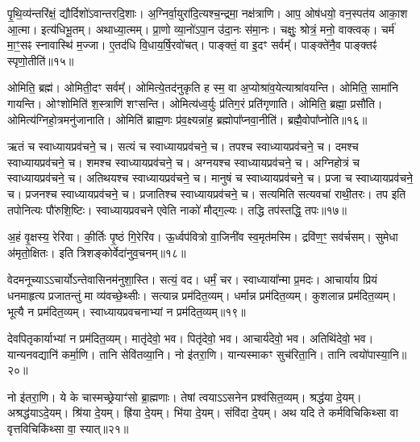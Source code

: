 पृ॒थि॒व्य॑न्तरि॑क्षं॒ द्यौर्दिशो॑ऽवान्तरदि॒शाः। 
अ॒ग्निर्वा॒युरा॑दि॒त्य\-श्च॒न्द्रमा॒ नक्ष॑त्राणि। 
आप॒ ओष॑धयो॒ वन॒स्पत॑य आका॒श आ॒त्मा। 
इत्य॑धिभू॒तम्। 
अथाध्या॒त्मम्। 
प्रा॒णो व्या॒नो॑ऽपा॒न उ॑दा॒नः स॑मा॒नः। 
चक्षुः॒ श्रोत्रं॒ मनो॒ वाक्त्वक्। 
चर्म॑ मा॒ꣳ॒सꣴ स्नावास्थि॑ म॒ज्जा। 
ए॒तद॑धि वि॒धाय॒र्\mbox{}षि॒रवो॑चत्। 
पाङ्क्तं॒ वा इ॒दꣳ सर्वम्᳚। 
पाङ्क्ते॑नै॒व पाङ्क्तꣴ॑ स्पृणो॒तीति॑॥१५॥
\anuvakamend[सर्व॒मेकं॑ च]

ओमिति॒ ब्रह्म॑। 
ओमिती॒दꣳ सर्वम्᳚। 
ओमित्ये॒तद॑नुकृति ह स्म॒ वा अ॒प्योश्रा॑व॒येत्याश्रा॑वयन्ति। 
ओमिति॒ सामा॑नि गायन्ति। 
ओꣳशोमिति॑ श॒स्त्राणि॑ शꣳसन्ति। 
ओमित्य॑ध्व॒र्युः प्र॑तिग॒रं प्रति॑गृणाति। 
ओमिति॒ ब्रह्मा॒ प्रसौ॑ति। 
ओमित्य॑ग्निहो॒त्रमनु॑जानाति। 
ओमिति॑ ब्राह्म॒णः प्र॑व॒क्ष्यन्ना॑ह॒ ब्रह्मोपा᳚प्नवा॒नीति॑। 
ब्रह्मै॒वो\-पा᳚प्नोति॥१६॥%
\anuvakamend[ओन्दश॑]

ऋतं च स्वाध्यायप्रव॑चने॒ च। 
सत्यं च स्वाध्यायप्रव॑चने॒ च। 
तपश्च स्वाध्यायप्रव॑चने॒ च। 
दमश्च स्वाध्यायप्रव॑चने॒ च। 
शमश्च स्वाध्यायप्रव॑चने॒ च। 
अग्नयश्च स्वाध्यायप्रव॑चने॒ च। 
अग्निहोत्रं च स्वाध्यायप्रव॑चने॒ च। 
अतिथयश्च स्वाध्यायप्रव॑चने॒ च। 
मानुषं च स्वाध्यायप्रव॑चने॒ च। 
प्रजा च स्वाध्यायप्रव॑चने॒ च। 
प्रजनश्च स्वाध्यायप्रव॑चने॒ च। 
प्रजातिश्च स्वाध्यायप्रव॑चने॒ च। 
सत्यमिति सत्यवचा॑ राथी॒तरः। 
तप इति तपोनित्यः पौ॑रुशि॒ष्टिः। 
स्वाध्यायप्रवचने एवेति नाको॑ मौद्ग॒ल्यः। 
तद्धि तप॑स्तद्धि॒ तपः॥१७॥
\anuvakamend[प्रजा च स्वाध्यायप्रव॑चने॒ च षट्च॑]

अ॒हं वृ॒क्षस्य॒ रेरि॑वा। 
की॒र्तिः पृ॒ष्ठं गि॒रेरि॑व। 
ऊ॒र्ध्वप॑वित्रो वा॒जिनी॑व स्व॒मृत॑मस्मि। 
द्रवि॑ण॒ꣳ॒ सव॑र्चसम्। 
सुमेधा अ॑मृतो॒क्षितः। 
इति त्रिशङ्कोर्वेदा॑नुव॒चनम्॥१८॥
\anuvakamend[अ॒हꣳ षट्]

वेदमनूच्याऽऽचार्योऽन्तेवासिनम॑नुशा॒स्ति। 
सत्यं॒ वद। 
धर्मं॒ चर। 
स्वाध्याया᳚न्मा प्र॒मदः। 
आचार्याय प्रियं धनमाहृत्य प्रजातन्तुं मा व्य॑वच्छे॒थ्सीः। 
सत्यान्न प्रम॑दित॒व्यम्। 
धर्मान्न प्रम॑दित॒व्यम्। 
कुशलान्न प्रम॑दित॒व्यम्। 
भूत्यै न प्रम॑दित॒व्यम्। 
स्वाध्यायप्रवचनाभ्यां न प्रम॑दित॒व्यम्॥१९॥

देवपितृकार्याभ्यां न प्रम॑दित॒व्यम्। 
मातृ॑देवो॒ भव। 
पितृ॑देवो॒ भव। 
आचार्य॑देवो॒ भव। 
अतिथि॑देवो॒ भव। 
यान्यनवद्यानि॑ कर्मा॒णि। 
तानि सेवि॑तव्या॒नि। 
नो इ॑तरा॒णि। 
यान्यस्माकꣳ सुच॑रिता॒नि। 
तानि त्वयो॑पास्या॒नि॥२०॥

नो इ॑तरा॒णि। 
ये के चास्मच्छ्रेयाꣳ॑सो ब्रा॒ह्मणाः। 
तेषां त्वयाऽऽसनेन प्रश्व॑सित॒व्यम्। 
श्रद्ध॑या दे॒यम्। 
अश्रद्ध॑याऽदे॒यम्। 
श्रि॑या दे॒यम्। 
ह्रि॑या दे॒यम्। 
भि॑या दे॒यम्। 
संवि॑दा दे॒यम्। 
अथ यदि ते कर्मविचिकिथ्सा वा वृत्तविचिकि॑थ्सा वा॒ स्यात्॥२१॥

